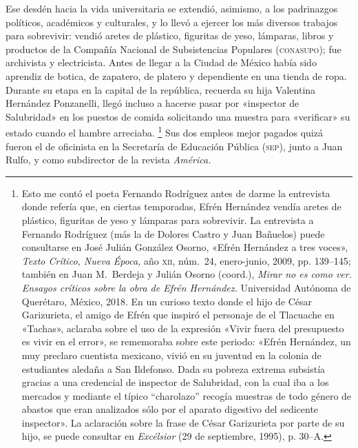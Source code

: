 \documentclass[14pt,twoside,final]{extbook} %
\let\oldfootnote\footnote
\renewcommand\footnote[1]{%
\oldfootnote{\hspace{1mm}#1}}
\begin{document}
Ese desdén hacia la vida universitaria se extendió, asimismo, a los padrinazgos políticos, académicos y culturales, y lo llevó a ejercer los más diversos trabajos para sobrevivir: vendió aretes de plástico, figuritas de yeso, lámparas, libros y productos de la Compañía Nacional de Subsistencias Populares (\textsc{conasupo}); fue archivista y electricista. Antes de llegar a la Ciudad de México había sido aprendiz de botica, de zapatero, de platero y dependiente en una tienda de ropa. Durante su etapa en la capital de la república, recuerda su hija Valentina Hernández Ponzanelli, llegó incluso a hacerse pasar por «inspector de Salubridad» en los puestos de comida solicitando una muestra para «verificar» su estado cuando el hambre arreciaba.\footnote{Esto me contó el poeta Fernando Rodríguez antes de darme la entrevista donde refería que, en ciertas temporadas, Efrén Hernández vendía aretes de plástico, figuritas de yeso y lámparas para sobrevivir. La entrevista a Fernando Rodríguez (más la de Dolores Castro y Juan Bañuelos) puede consultarse en José Julián González Osorno, «Efrén Hernández a tres voces», \emph{Texto Crítico, Nueva Época,} año \textsc{xii}, núm.~24, enero-junio, 2009, pp. 139--145; también en Juan M.~Berdeja y Julián Osorno (coord.), \emph{Mirar no es como ver. Ensayos críticos sobre la obra de Efrén Hernández.} Universidad Autónoma de Querétaro, México, 2018. En un curioso texto donde el hijo de César Garizurieta, el amigo de Efrén que inspiró el personaje de el Tlacuache en «Tachas», aclaraba sobre el uso de la expresión «Vivir fuera del presupuesto es vivir en el error», se rememoraba sobre este periodo: «Efrén Hernández, un muy preclaro cuentista mexicano, vivió en su juventud en la colonia de estudiantes aledaña a San Ildefonso. Dada su pobreza extrema subsistía gracias a una credencial de inspector de Salubridad, con la cual iba a los mercados y mediante el típico ``charolazo'' recogía muestras de todo género de abastos que eran analizados sólo por el aparato digestivo del sedicente inspector». La aclaración sobre la frase de César Garizurieta por parte de su hijo, se puede consultar en \emph{Excélsior} (29 de septiembre, 1995), p. 30--A.} Sus dos empleos mejor pagados quizá fueron el de oficinista en la Secretaría de Educación Pública (\textsc{sep}), junto a Juan Rulfo, y como subdirector de la revista \emph{América.}
\end{document}
